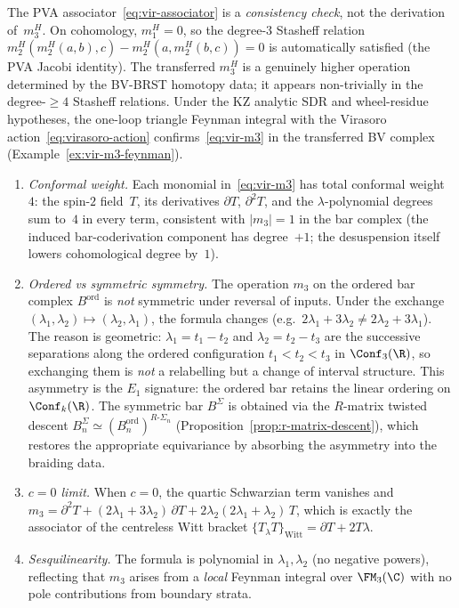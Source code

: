 \begin{remark}
\label{rem:vir-m3-transfer-method}
The PVA associator~\eqref{eq:vir-associator} is a \emph{consistency check}, not the derivation of~$m_3^H$. On cohomology, $m_1^H = 0$, so the degree-$3$ Stasheff relation
$m_2^H(m_2^H(a,b),c) - m_2^H(a,m_2^H(b,c)) = 0$
is automatically satisfied (the PVA Jacobi identity).
The transferred $m_3^H$ is a genuinely higher operation
determined by the BV-BRST homotopy data;
it appears non-trivially in the degree-$\ge 4$ Stasheff relations.
Under the KZ analytic SDR and wheel-residue hypotheses, the one-loop
triangle Feynman integral with the Virasoro action~\eqref{eq:virasoro-action}
confirms~\eqref{eq:vir-m3} in the transferred BV complex
(Example~\ref{ex:vir-m3-feynman}).
\end{remark}

\begin{remark}
\label{rem:m3-checks}
\leavevmode
\begin{enumerate}
\item \emph{Conformal weight.} Each monomial in~\eqref{eq:vir-m3}
 has total conformal weight~$4$: the spin-$2$ field~$T$,
 its derivatives $\partial T$, $\partial^2 T$, and the
 $\lambda$-polynomial degrees sum to~$4$ in every term,
 consistent with $|m_3| = 1$ in the bar complex
 (the induced bar-coderivation component has degree~$+1$; the
 desuspension itself lowers cohomological degree by~$1$).
\item \emph{Ordered vs symmetric symmetry.} The operation $m_3$
 on the ordered bar complex $B^{\mathrm{ord}}$ is \emph{not}
 symmetric under reversal of inputs. Under the exchange
 $(\lambda_1, \lambda_2) \mapsto (\lambda_2, \lambda_1)$,
 the formula changes (e.g.\ $2\lambda_1 + 3\lambda_2 \ne
 2\lambda_2 + 3\lambda_1$). The reason is geometric:
 $\lambda_1 = t_1 - t_2$ and $\lambda_2 = t_2 - t_3$ are
 the successive separations along the ordered configuration
 $t_1 < t_2 < t_3$ in $\Conf_3(\R)$, so exchanging them
 is \emph{not} a relabelling but a change of interval
 structure. This asymmetry is the $E_1$ signature: the
 ordered bar retains the linear ordering on $\Conf_k(\R)$.
 The symmetric bar $B^{\Sigma}$ is obtained via the
 $R$-matrix twisted descent
 $B^{\Sigma}_n \simeq (B^{\mathrm{ord}}_n)^{R\text{-}\Sigma_n}$
 (Proposition~\ref{prop:r-matrix-descent}), which restores
 the appropriate equivariance by absorbing the asymmetry
 into the braiding data.
\item \emph{$c = 0$ limit.} When $c = 0$, the quartic Schwarzian
 term vanishes and $m_3 = \partial^2 T +
 (2\lambda_1 + 3\lambda_2)\,\partial T +
 2\lambda_2(2\lambda_1 + \lambda_2)\,T$, which is exactly the
 associator of the centreless Witt bracket
 $\{T_\lambda T\}_{\text{Witt}} = \partial T + 2T\lambda$.
\item \emph{Sesquilinearity.} The formula is polynomial
 in $\lambda_1, \lambda_2$ (no negative powers), reflecting
 that $m_3$ arises from a \emph{local} Feynman integral over
 $\FM_3(\C)$ with no pole contributions from boundary strata.
\end{enumerate}
\end{remark}

